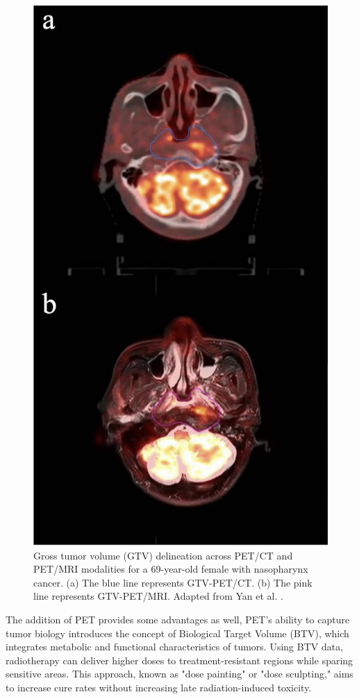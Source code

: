 \begin{multicols}{2}
\begin{figure}[H]
	\centering
	\includegraphics[width=0.8\columnwidth]{assets/GTV_Delineation_PETCT_vs_PETMRI.png} 
	\caption{Gross tumor volume (GTV) delineation across PET/CT and PET/MRI modalities for a 69-year-old female with nasopharynx cancer. (a) The blue line represents GTV-PET/CT. (b) The pink line represents GTV-PET/MRI. Adapted from Yan et al. \cite{yan2024}.}
	\label{fig:gtv_delineation_cropped}
\end{figure}

The addition of PET provides some advantages as well, PET’s ability to capture tumor biology introduces the concept of Biological Target Volume (BTV), which integrates metabolic and functional characteristics of tumors. Using BTV data, radiotherapy can deliver higher doses to treatment-resistant regions while sparing sensitive areas. This approach, known as "dose painting" or "dose sculpting," aims to increase cure rates without increasing late radiation-induced toxicity. \cite{Schinagl2006}


\end{multicols}
